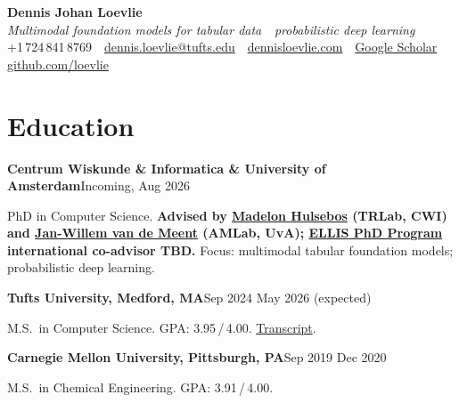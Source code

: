 \documentclass[10pt,letterpaper]{article}
\newcommand{\sansfam}{\sffamily}
\newcommand{\datestamp}[1]{{\sansfam\footnotesize\color{meta}\figureversion{lf}#1}}
\newcommand{\role}[2]{%
  \filbreak%
  \par\vspace{1pt}%
  \noindent\textbf{#1}\hfill\datestamp{#2}\par\nopagebreak}
\begin{document}
\thispagestyle{cvfirst}

\begin{center}
{\sansfam\fontsize{22pt}{26pt}\selectfont\bfseries\color{accent} Dennis Johan Loevlie}\\[2pt]
{\footnotesize\itshape\color{meta}Multimodal foundation models for tabular data \,\textperiodcentered\, probabilistic deep learning}\\[3pt]
{\sansfam\footnotesize\color{meta}%
+1\,724\,841\,8769 \,\textperiodcentered\,
\href{mailto:dennis.loevlie@tufts.edu}{dennis.loevlie@tufts.edu} \,\textperiodcentered\,
\href{https://www.dennisloevlie.com}{dennisloevlie.com} \,\textperiodcentered\,
\href{https://scholar.google.com/citations?user=oGkEIYkAAAAJ}{Google Scholar} \,\textperiodcentered\,
\href{https://github.com/loevlie}{github.com/loevlie}}
\end{center}
\vspace{-4pt}{\color{rule}\rule{\linewidth}{0.5pt}}

\section{Education}

\role{Centrum Wiskunde \& Informatica \& University of Amsterdam}{Incoming, Aug 2026 \textendash{}}
PhD in Computer Science. \textbf{Advised by \href{https://madelonhulsebos.github.io/}{Madelon Hulsebos} (TRLab, CWI) and \href{https://jwvdm.github.io/}{Jan-Willem van de Meent} (AMLab, UvA); \href{https://ellis.eu/phd-postdoc}{ELLIS PhD Program} international co-advisor TBD.} Focus: multimodal tabular foundation models; probabilistic deep learning.

\role{Tufts University, Medford, MA}{Sep 2024 \textendash{} May 2026 (expected)}
M.S.\ in Computer Science. GPA: 3.95\,/\,4.00. \href{https://www.loevliedl.com/static/Portfolio/PDF/SSR_TSRPT.pdf}{Transcript}.

\role{Carnegie Mellon University, Pittsburgh, PA}{Sep 2019 \textendash{} Dec 2020}
M.S.\ in Chemical Engineering. GPA: 3.91\,/\,4.00.
\end{document}
